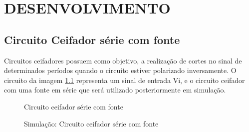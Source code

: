 \chapter{DESENVOLVIMENTO}

\section{Circuito Ceifador série com fonte}

Circuitos ceifadores possuem como objetivo, a realização de cortes no sinal de determinados períodos quando o circuito estiver polarizado inversamente. O circuito da imagem \ref{fig:ImagemSlide01} representa um sinal de entrada Vi, e o circuito ceifador com uma fonte em série que será utilizado posteriormente em simulação.

\begin{figure}[H]
    \centering
    \caption{Circuito ceifador série com fonte}
    \vspace{-0.3cm}
    \label{fig:ImagemSlide01}
\end{figure}

\begin{figure}[H]
    \centering
    \caption{Simulação: Circuito ceifador série com fonte}
    \vspace{-0.3cm}
    \label{fig:SimulacaoCircuito01}
\end{figure}

